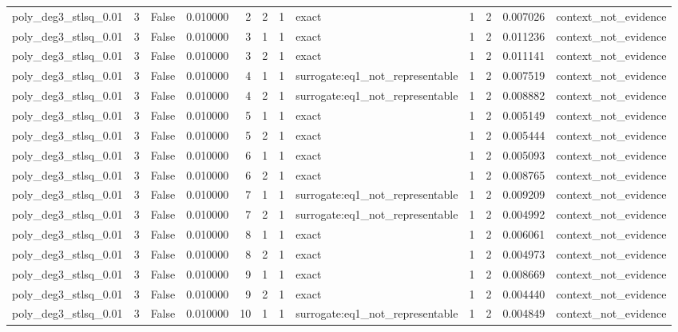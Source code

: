 \begin{tabular}{lrrrrrrlrrrl}
poly\_deg3\_stlsq\_0.01 & 3 & False & 0.010000 & 2 & 2 & 1 & exact & 1 & 2 & 0.007026 & context\_not\_evidence \\
poly\_deg3\_stlsq\_0.01 & 3 & False & 0.010000 & 3 & 1 & 1 & exact & 1 & 2 & 0.011236 & context\_not\_evidence \\
poly\_deg3\_stlsq\_0.01 & 3 & False & 0.010000 & 3 & 2 & 1 & exact & 1 & 2 & 0.011141 & context\_not\_evidence \\
poly\_deg3\_stlsq\_0.01 & 3 & False & 0.010000 & 4 & 1 & 1 & surrogate:eq1\_not\_representable & 1 & 2 & 0.007519 & context\_not\_evidence \\
poly\_deg3\_stlsq\_0.01 & 3 & False & 0.010000 & 4 & 2 & 1 & surrogate:eq1\_not\_representable & 1 & 2 & 0.008882 & context\_not\_evidence \\
poly\_deg3\_stlsq\_0.01 & 3 & False & 0.010000 & 5 & 1 & 1 & exact & 1 & 2 & 0.005149 & context\_not\_evidence \\
poly\_deg3\_stlsq\_0.01 & 3 & False & 0.010000 & 5 & 2 & 1 & exact & 1 & 2 & 0.005444 & context\_not\_evidence \\
poly\_deg3\_stlsq\_0.01 & 3 & False & 0.010000 & 6 & 1 & 1 & exact & 1 & 2 & 0.005093 & context\_not\_evidence \\
poly\_deg3\_stlsq\_0.01 & 3 & False & 0.010000 & 6 & 2 & 1 & exact & 1 & 2 & 0.008765 & context\_not\_evidence \\
poly\_deg3\_stlsq\_0.01 & 3 & False & 0.010000 & 7 & 1 & 1 & surrogate:eq1\_not\_representable & 1 & 2 & 0.009209 & context\_not\_evidence \\
poly\_deg3\_stlsq\_0.01 & 3 & False & 0.010000 & 7 & 2 & 1 & surrogate:eq1\_not\_representable & 1 & 2 & 0.004992 & context\_not\_evidence \\
poly\_deg3\_stlsq\_0.01 & 3 & False & 0.010000 & 8 & 1 & 1 & exact & 1 & 2 & 0.006061 & context\_not\_evidence \\
poly\_deg3\_stlsq\_0.01 & 3 & False & 0.010000 & 8 & 2 & 1 & exact & 1 & 2 & 0.004973 & context\_not\_evidence \\
poly\_deg3\_stlsq\_0.01 & 3 & False & 0.010000 & 9 & 1 & 1 & exact & 1 & 2 & 0.008669 & context\_not\_evidence \\
poly\_deg3\_stlsq\_0.01 & 3 & False & 0.010000 & 9 & 2 & 1 & exact & 1 & 2 & 0.004440 & context\_not\_evidence \\
poly\_deg3\_stlsq\_0.01 & 3 & False & 0.010000 & 10 & 1 & 1 & surrogate:eq1\_not\_representable & 1 & 2 & 0.004849 & context\_not\_evidence \\

\end{tabular}
